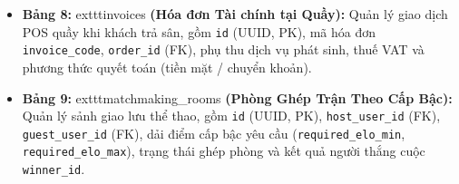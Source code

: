 \begin{itemize}[leftmargin=1.0cm]
    \item \textbf{Bảng 8: }	exttt{invoices}\textbf{ (Hóa đơn Tài chính tại Quầy):} Quản lý giao dịch POS quầy khi khách trả sân, gồm \texttt{id} (UUID, PK), mã hóa đơn \texttt{invoice\_code}, \texttt{order\_id} (FK), phụ thu dịch vụ phát sinh, thuế VAT và phương thức quyết toán (tiền mặt / chuyển khoản).
    \item \textbf{Bảng 9: }	exttt{matchmaking\_rooms}\textbf{ (Phòng Ghép Trận Theo Cấp Bậc):} Quản lý sảnh giao lưu thể thao, gồm \texttt{id} (UUID, PK), \texttt{host\_user\_id} (FK), \texttt{guest\_user\_id} (FK), dải điểm cấp bậc yêu cầu (\texttt{required\_elo\_min}, \texttt{required\_elo\_max}), trạng thái ghép phòng và kết quả người thắng cuộc \texttt{winner\_id}.
\end{itemize}

